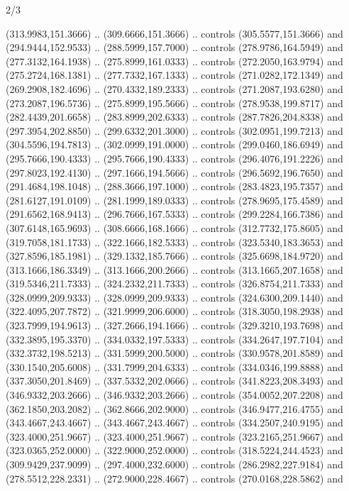 \begin{flagdescription}{2/3}
\begin{scope}[xshift=0.5\flaglength,yshift=0.5\flagwidth,scale=\flagwidth/525.28]
\begin{scope}[y=0.1mm, x=0.1mm, yscale=-1,shift={(-381.5,-404)}]
\begin{scope}[shift={(5.25001,4.53053)},miter limit=4.00,line width=0.800\lw]
  (313.9983,151.3666) .. (309.6666,151.3666) .. controls (305.5577,151.3666) and
  (294.9444,152.9533) .. (288.5999,157.7000) .. controls (278.9786,164.5949) and
  (277.3132,164.1938) .. (275.8999,161.0333) .. controls (272.2050,163.9794) and
  (275.2724,168.1381) .. (277.7332,167.1333) .. controls (271.0282,172.1349) and
  (269.2908,182.4696) .. (270.4332,189.2333) .. controls (271.2087,193.6280) and
  (273.2087,196.5736) .. (275.8999,195.5666) .. controls (278.9538,199.8717) and
  (282.4439,201.6658) .. (283.8999,202.6333) .. controls (287.7826,204.8338) and
  (297.3954,202.8850) .. (299.6332,201.3000) .. controls (302.0951,199.7213) and
  (304.5596,194.7813) .. (302.0999,191.0000) .. controls (299.0460,186.6949) and
  (295.7666,190.4333) .. (295.7666,190.4333) .. controls (296.4076,191.2226) and
  (297.8023,192.4130) .. (297.1666,194.5666) .. controls (296.5692,196.7650) and
  (291.4684,198.1048) .. (288.3666,197.1000) .. controls (283.4823,195.7357) and
  (281.6127,191.0109) .. (281.1999,189.0333) .. controls (278.9695,175.4589) and
  (291.6562,168.9413) .. (296.7666,167.5333) .. controls (299.2284,166.7386) and
  (307.6148,165.9693) .. (308.6666,168.1666) .. controls (312.7732,175.8605) and
  (319.7058,181.1733) .. (322.1666,182.5333) .. controls (323.5340,183.3653) and
  (327.8596,185.1981) .. (329.1332,185.7666) .. controls (325.6698,184.9720) and
  (313.1666,186.3349) .. (313.1666,200.2666) .. controls (313.1665,207.1658) and
  (319.5346,211.7333) .. (324.2332,211.7333) .. controls (326.8754,211.7333) and
  (328.0999,209.9333) .. (328.0999,209.9333) .. controls (324.6300,209.1440) and
  (322.4095,207.7872) .. (321.9999,206.6000) .. controls (318.3050,198.2938) and
  (323.7999,194.9613) .. (327.2666,194.1666) .. controls (329.3210,193.7698) and
  (332.3895,195.3370) .. (334.0332,197.5333) .. controls (334.2647,197.7104) and
  (332.3732,198.5213) .. (331.5999,200.5000) .. controls (330.9578,201.8589) and
  (330.1540,205.6008) .. (331.7999,204.6333) .. controls (334.0346,199.8888) and
  (337.3050,201.8469) .. (337.5332,202.0666) .. controls (341.8223,208.3493) and
  (346.9332,203.2666) .. (346.9332,203.2666) .. controls (354.0052,207.2208) and
  (362.1850,203.2082) .. (362.8666,202.9000) .. controls (346.9477,216.4755) and
  (343.4667,243.4667) .. (343.4667,243.4667) .. controls (334.2507,240.9195) and
  (323.4000,251.9667) .. (323.4000,251.9667) .. controls (323.2165,251.9667) and
  (323.0365,252.0000) .. (322.9000,252.0000) .. controls (318.5224,244.4523) and
  (309.9429,237.9099) .. (297.4000,232.6000) .. controls (286.2982,227.9184) and
  (278.5512,228.2331) .. (272.9000,228.4667) .. controls (270.0168,228.5862) and

\end{scope}
\end{scope}
\end{scope}
\end{flagdescription}
